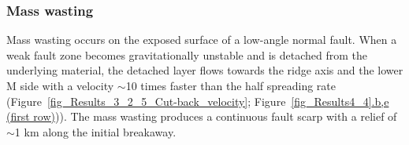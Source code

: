 \subsubsection{Mass wasting}\label{para_CutBack}


Mass wasting occurs on the exposed surface of a low-angle normal fault. %
%
%
When a weak fault zone becomes gravitationally unstable and is detached from the underlying material, the detached layer flows towards the ridge axis and the lower M side with a velocity $\sim$10 times faster than the half spreading rate (Figure~\hyperref[fig_Results_3_2_5_Cut-back_velocity]{\ref{fig_Results_3_2_5_Cut-back_velocity}}; Figure~\hyperref[fig_Results4_4]{\ref{fig_Results4_4}.b,e (first row)})). 
The mass wasting produces a continuous fault scarp with a relief of $\sim$1 km along the initial breakaway. 

